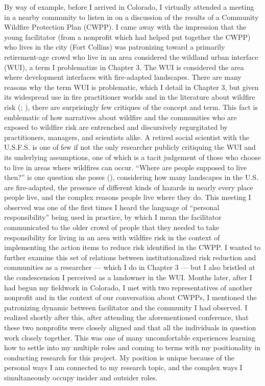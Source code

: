 \documentclass[
]{article}
\begin{document}
By way of example, before I arrived in Colorado, I virtually attended a meeting in a nearby community to listen in on a discussion of the results of a Community Wildfire Protection Plan (CWPP). I came away with the impression that the young facilitator (from a nonprofit which had helped put together the CWPP) who lives in the city (Fort Collins) was patronizing toward a primarily retirement-age crowd who live in an area considered the wildland urban interface (WUI), a term I problematize in Chapter 3. The WUI is considered the area where development interfaces with fire-adapted landscapes. There are many reasons why the term WUI is problematic, which I detail in Chapter 3, but given its widespread use in fire practitioner worlds and in the literature about wildfire risk (; ), there are surprisingly few critiques of the concept and term. This fact is emblematic of how narratives about wildfire and the communities who are exposed to wildfire risk are entrenched and discursively regurgitated by practitioners, managers, and scientists alike. A retired social scientist with the U.S.F.S. is one of few if not the only researcher publicly critiquing the WUI and its underlying assumptions, one of which is a tacit judgement of those who choose to live in areas where wildfires can occur. ``Where are people supposed to live then?'' is one question she poses (), considering how many landscapes in the U.S. are fire-adapted, the presence of different kinds of hazards in nearly every place people live, and the complex reasons people live where they do. This meeting I observed was one of the first times I heard the language of ``personal responsibility'' being used in practice, by which I mean the facilitator communicated to the older crowd of people that they needed to take responsibility for living in an area with wildfire risk in the context of implementing the action items to reduce risk identified in the CWPP. I wanted to further examine this set of relations between institutionalized risk reduction and communities as a researcher --- which I do in Chapter 3 --- but I also bristled at the condescension I perceived as a landowner in the WUI. Months later, after I had begun my fieldwork in Colorado, I met with two representatives of another nonprofit and in the context of our conversation about CWPPs, I mentioned the patronizing dynamic between facilitator and the community I had observed. I realized shortly after this, after attending the aforementioned conference, that these two nonprofits were closely aligned and that all the individuals in question work closely together. This was one of many uncomfortable experiences learning how to settle into my multiple roles and coming to terms with my positionality in conducting research for this project. My position is unique because of the personal ways I am connected to my research topic, and the complex ways I simultaneously occupy insider and outsider roles.
\end{document}
